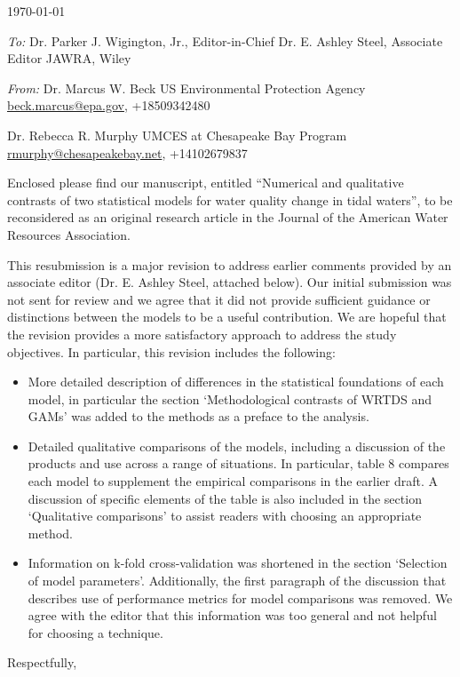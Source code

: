 \documentclass[a4paper,12pt]{article}
\begin{document}
\renewcommand{\rmdefault}{ptm}
\pagestyle{empty} 

\setlength{\parindent}{0mm} 
\setlength{\parskip}{5mm}

\begin{flushright}
\today
\end{flushright}

\emph{To:}\newline
Dr. Parker J. Wigington, Jr., Editor-in-Chief\newline
Dr. E. Ashley Steel, Associate Editor\newline
JAWRA, Wiley

\emph{From:}\newline
Dr. Marcus W. Beck\newline
US Environmental Protection Agency\newline
\href{mailto:beck.marcus@epa.gov}{beck.marcus@epa.gov}, +18509342480

Dr. Rebecca R. Murphy\newline
UMCES at Chesapeake Bay Program\newline
\href{mailto:rmurphy@chesapeakebay.net}{rmurphy@chesapeakebay.net}, +14102679837 \vspace{14.5pt}

Enclosed please find our manuscript, entitled ``Numerical and qualitative contrasts of two statistical models for water quality change in tidal waters'', to be reconsidered as an original research article in the Journal of the American Water Resources Association.  

This resubmission is a major revision to address earlier comments provided by an associate editor (Dr. E. Ashley Steel, attached below). Our initial submission was not sent for review and we agree that it did not provide sufficient guidance or distinctions between the models to be a useful contribution.  We are hopeful that the revision provides a more satisfactory approach to address the study objectives.  In particular, this revision includes the following:
\begin{itemize}
\item More detailed description of differences in the statistical foundations of each model, in particular the section `Methodological contrasts of WRTDS and GAMs' was added to the methods as a preface to the analysis.  
\item Detailed qualitative comparisons of the models, including a discussion of the products and use across a range of situations.  In particular, table 8 compares each model to supplement the empirical comparisons in the earlier draft.  A discussion of specific elements of the table is also included in the section `Qualitative comparisons' to assist readers with choosing an appropriate method.
\item Information on k-fold cross-validation was shortened in the section `Selection of model parameters'.  Additionally, the first paragraph of the discussion that describes use of performance metrics for model comparisons was removed.  We agree with the editor that this information was too general and not helpful for choosing a technique.
\end{itemize}
\hspace{4.5in}Respectfully,
\end{document}
